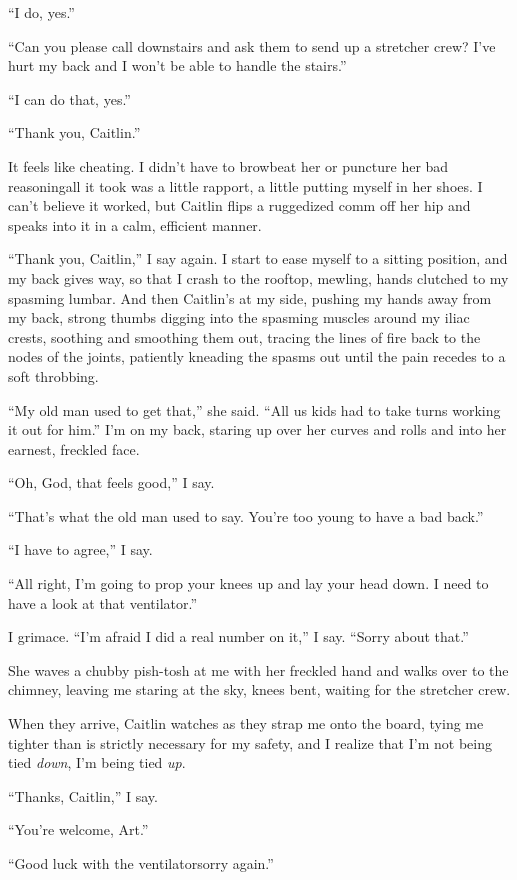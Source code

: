 “I do, yes.”

“Can you please call downstairs and ask them to send up a stretcher
crew? I’ve hurt my back and I won’t be able to handle the stairs.”

“I can do that, yes.”

“Thank you, Caitlin.”

It feels like cheating. I didn’t have to browbeat her or puncture
her bad reasoning{\dash}all it took was a little rapport, a little
putting myself in her shoes. I can’t believe it worked, but Caitlin
flips a ruggedized comm off her hip and speaks into it in a calm,
efficient manner.

“Thank you, Caitlin,” I say again. I start to ease myself to a
sitting position, and my back gives way, so that I crash to the
rooftop, mewling, hands clutched to my spasming lumbar. And then
Caitlin’s at my side, pushing my hands away from my back, strong
thumbs digging into the spasming muscles around my iliac crests,
soothing and smoothing them out, tracing the lines of fire back to
the nodes of the joints, patiently kneading the spasms out until
the pain recedes to a soft throbbing.

“My old man used to get that,” she said. “All us kids had to take
turns working it out for him.” I’m on my back, staring up over her
curves and rolls and into her earnest, freckled face.

“Oh, God, that feels good,” I say.

“That’s what the old man used to say. You’re too young to have a
bad back.”

“I have to agree,” I say.

“All right, I’m going to prop your knees up and lay your head down.
I need to have a look at that ventilator.”

I grimace. “I’m afraid I did a real number on it,” I say. “Sorry
about that.”

She waves a chubby pish-tosh at me with her freckled hand and walks
over to the chimney, leaving me staring at the sky, knees bent,
waiting for the stretcher crew.

When they arrive, Caitlin watches as they strap me onto the board,
tying me tighter than is strictly necessary for my safety, and I
realize that I’m not being tied \emph{down}, I’m being tied
\emph{up}.

“Thanks, Caitlin,” I say.

“You’re welcome, Art.”

“Good luck with the ventilator{\dash}sorry again.”

